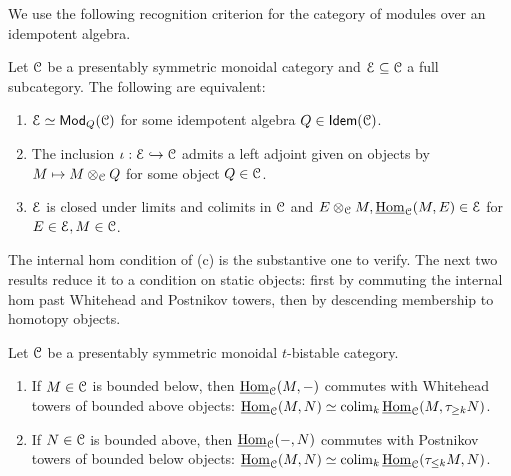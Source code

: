 We use the following recognition criterion for the category of modules over an idempotent algebra. 
\begin{proposition}\label{prop: idempotent recognition}
    Let $\EuScript{C}$ be a presentably symmetric monoidal category and $\EuScript{E}\subseteq\EuScript{C}$ a full subcategory. The following are equivalent: 
    \begin{enumerate}[label=(\alph*)]
        \item $\EuScript{E}\simeq\mathsf{Mod}_{Q}(\EuScript{C})$ for some idempotent algebra $Q\in\mathsf{Idem}(\EuScript{C})$. 
        \item The inclusion $\iota:\EuScript{E}\hookrightarrow\EuScript{C}$ admits a left adjoint given on objects by $M\mapsto M\otimes_{\EuScript{C}}Q$ for some object $Q\in\EuScript{C}$. 
        \item $\EuScript{E}$ is closed under limits and colimits in $\EuScript{C}$ and $E\otimes_{\EuScript{C}}M,\underline{\mathrm{Hom}}_{\EuScript{C}}(M,E)\in\EuScript{E}$ for $E\in\EuScript{E},M\in\EuScript{C}$.
    \end{enumerate}
\end{proposition}
The internal hom condition of  (c) is the substantive one to verify. The next two results reduce it to a condition on static objects: first by commuting the internal hom past Whitehead and Postnikov towers, then by descending membership to homotopy objects.
\begin{lemma}\label{lem: internal hom and towers}
    Let $\EuScript{C}$ be a presentably symmetric monoidal $t$-bistable category. 
    \begin{enumerate}
        \item If $M\in\EuScript{C}$ is bounded below, then $\underline{\mathrm{Hom}}_{\EuScript{C}}(M,-)$ commutes with Whitehead towers of bounded above objects: $\underline{\mathrm{Hom}}_{\EuScript{C}}(M, N)\simeq\operatorname*{colim}_{k}\underline{\mathrm{Hom}}_{\EuScript{C}}(M,\tau_{\geq k}N)$. 
        \item If $N\in\EuScript{C}$ is bounded above, then $\underline{\mathrm{Hom}}_{\EuScript{C}}(-,N)$ commutes with Postnikov towers of bounded below objects: $\underline{\mathrm{Hom}}_{\EuScript{C}}(M, N)\simeq\operatorname*{colim}_{k}\underline{\mathrm{Hom}}_{\EuScript{C}}(\tau_{\leq k}M, N)$. 
    \end{enumerate}
\end{lemma}
